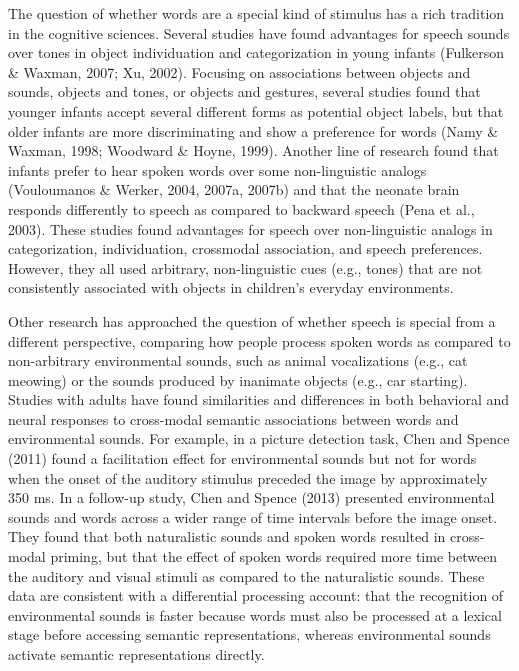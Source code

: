 \documentclass[english,floatsintext,man]{apa6}
\theoremstyle{definition}
\theoremstyle{definition}
\theoremstyle{definition}
\theoremstyle{remark}
\begin{document}
The question of whether words are a special kind of stimulus has a rich
tradition in the cognitive sciences. Several studies have found
advantages for speech sounds over tones in object individuation and
categorization in young infants (Fulkerson \& Waxman, 2007; Xu, 2002).
Focusing on associations between objects and sounds, objects and tones,
or objects and gestures, several studies found that younger infants
accept several different forms as potential object labels, but that
older infants are more discriminating and show a preference for words
(Namy \& Waxman, 1998; Woodward \& Hoyne, 1999). Another line of
research found that infants prefer to hear spoken words over some
non-linguistic analogs (Vouloumanos \& Werker, 2004, 2007a, 2007b) and
that the neonate brain responds differently to speech as compared to
backward speech (Pena et al., 2003). These studies found advantages for
speech over non-linguistic analogs in categorization, individuation,
crossmodal association, and speech preferences. However, they all used
arbitrary, non-linguistic cues (e.g., tones) that are not consistently
associated with objects in children's everyday environments.

Other research has approached the question of whether speech is special
from a different perspective, comparing how people process spoken words
as compared to non-arbitrary environmental sounds, such as animal
vocalizations (e.g., cat meowing) or the sounds produced by inanimate
objects (e.g., car starting). Studies with adults have found
similarities and differences in both behavioral and neural responses to
cross-modal semantic associations between words and environmental
sounds. For example, in a picture detection task, Chen and Spence (2011)
found a facilitation effect for environmental sounds but not for words
when the onset of the auditory stimulus preceded the image by
approximately 350 ms. In a follow-up study, Chen and Spence (2013)
presented environmental sounds and words across a wider range of time
intervals before the image onset. They found that both naturalistic
sounds and spoken words resulted in cross-modal priming, but that the
effect of spoken words required more time between the auditory and
visual stimuli as compared to the naturalistic sounds. These data are
consistent with a differential processing account: that the recognition
of environmental sounds is faster because words must also be processed
at a lexical stage before accessing semantic representations, whereas
environmental sounds activate semantic representations directly.
\end{document}
